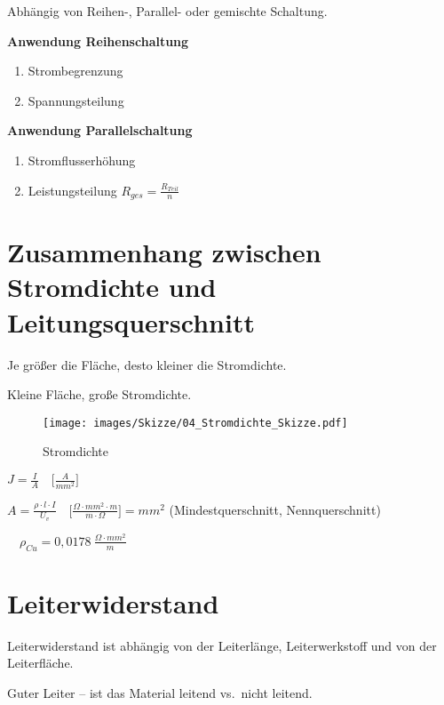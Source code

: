 Abhängig von Reihen-, Parallel- oder gemischte Schaltung.

\textbf{Anwendung Reihenschaltung}

\begin{enumerate}
\def\labelenumi{(\arabic{enumi})}
\item
  Strombegrenzung
\item
  Spannungsteilung
\end{enumerate}

\textbf{Anwendung Parallelschaltung}

\begin{enumerate}
\def\labelenumi{(\arabic{enumi})}
\item
  Stromflusserhöhung
\item
  Leistungsteilung $\boxed{R_{ges} = \frac{R_{Teil}}{n}}$
\end{enumerate}

\section{Zusammenhang zwischen Stromdichte und
Leitungsquerschnitt}\label{zusammenhang-zwischen-stromdichte-und-leitungsquerschnitt}

Je größer die Fläche, desto kleiner die Stromdichte.

Kleine Fläche, große Stromdichte.

\begin{figure}[!ht]%
\centering
\texttt{[image: images/Skizze/04\_Stromdichte\_Skizze.pdf]}
\caption{Stromdichte}
\end{figure}

$\boxed{J = \frac{I}{A}} \quad \bigl[\frac{A}{mm^2}\bigl]$

$\boxed{A = \frac{\rho \cdot l \cdot I}{U_v}} \quad \bigl[\frac{\Omega \cdot mm^2 \cdot m}{m \cdot \Omega}\bigl] = mm^2$
(Mindestquerschnitt, Nennquerschnitt)

$\quad \rho_{Cu} = 0,0178~\frac{\Omega \cdot mm^2}{m}$

\section{Leiterwiderstand}\label{leiterwiderstand}

Leiterwiderstand ist abhängig von der Leiterlänge, Leiterwerkstoff und
von der Leiterfläche.

Guter Leiter -- ist das Material leitend vs.~nicht leitend.

